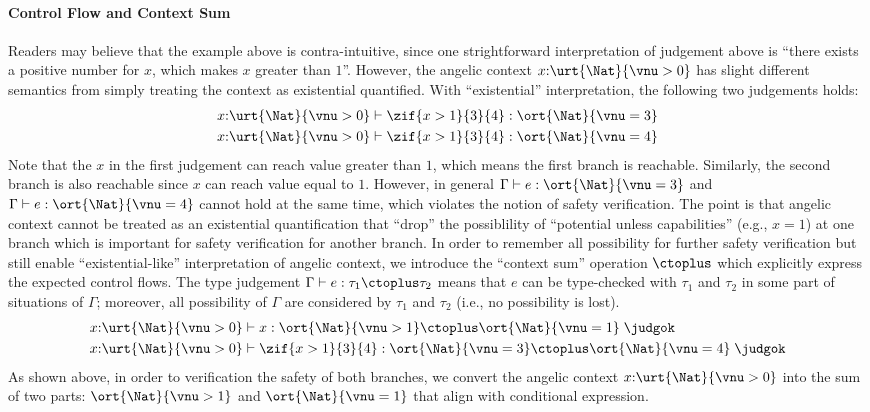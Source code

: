 \paragraph{Control Flow and Context Sum} Readers may believe that the example above is contra-intuitive, since one strightforward interpretation of judgement above is ``there exists a positive number for $x$, which makes $x$ greater than $1$''. However, the angelic context $x{:}\urt{\Nat}{\vnu > 0}$ has slight different semantics from simply treating the context as existential quantified.
With ``existential'' interpretation, the following two judgements holds:
\begin{align*}
  &x{:}\urt{\Nat}{\vnu > 0} \vdash \zif{x > 1}{3}{4} : \ort{\Nat}{\vnu = 3}
  \\&x{:}\urt{\Nat}{\vnu > 0} \vdash \zif{x > 1}{3}{4} : \ort{\Nat}{\vnu = 4}
\end{align*}\noindent
Note that the $x$ in the first judgement can reach value greater than $1$, which means the first branch is reachable. Similarly, the second branch is also reachable since $x$ can reach value equal to $1$. However, in general $\Gamma \vdash e : \ort{\Nat}{\vnu = 3}$ and $\Gamma \vdash e : \ort{\Nat}{\vnu = 4}$ cannot hold at the same time, which violates the notion of safety verification. The point is that angelic context cannot be treated as an existential quantification that ``drop'' the possiblility of ``potential unless capabilities'' (e.g., $x = 1$) at one branch which is important for safety verification for another branch. In order to remember all possibility for further safety verification but still enable ``existential-like'' interpretation of angelic context, we introduce the ``context sum'' operation $\ctoplus$ which explicitly express the expected control flows. The type judgement $\Gamma \vdash e : \tau_1 \ctoplus \tau_2$ means that $e$ can be type-checked with $\tau_1$ and $\tau_2$ in some part of situations of $\Gamma$; moreover, all possibility of $\Gamma$ are considered by $\tau_1$ and $\tau_2$ (i.e., no possibility is lost).
\begin{align*}
  &x{:}\urt{\Nat}{\vnu > 0} \vdash x : \ort{\Nat}{\vnu > 1}\ctoplus \ort{\Nat}{\vnu = 1} \;\judgok
  \\&x{:}\urt{\Nat}{\vnu > 0} \vdash \zif{x > 1}{3}{4} : \ort{\Nat}{\vnu = 3}\ctoplus \ort{\Nat}{\vnu = 4} \;\judgok
\end{align*}\noindent
As shown above, in order to verification the safety of both branches, we convert the angelic context $x{:}\urt{\Nat}{\vnu > 0}$ into the sum of two parts: $\ort{\Nat}{\vnu > 1}$ and $\ort{\Nat}{\vnu = 1}$ that align with conditional expression.

